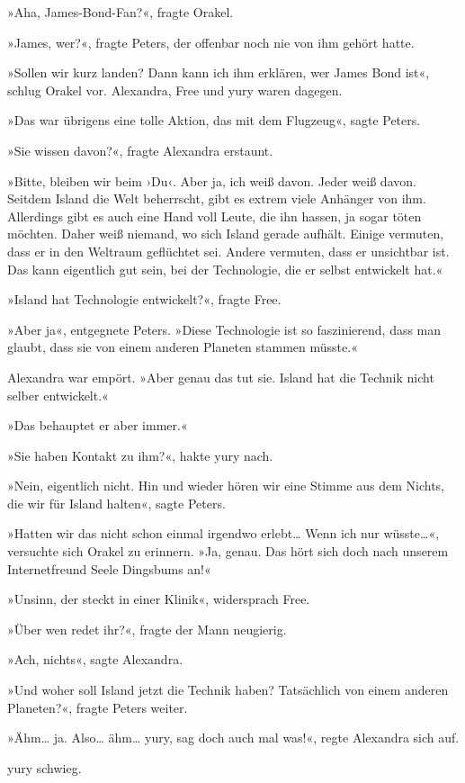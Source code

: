 »Aha, James-Bond-Fan?«, fragte Orakel.

»James, wer?«, fragte Peters, der offenbar noch nie von ihm gehört hatte.

»Sollen wir kurz landen? Dann kann ich ihm erklären, wer James Bond ist«, schlug Orakel vor. Alexandra, Free und yury waren dagegen.

»Das war übrigens eine tolle Aktion, das mit dem Flugzeug«, sagte Peters.

»Sie wissen davon?«, fragte Alexandra erstaunt.

»Bitte, bleiben wir beim ›Du‹. Aber ja, ich weiß davon. Jeder weiß davon. Seitdem Island die Welt beherrscht, gibt es extrem viele Anhänger von ihm. Allerdings gibt es auch eine Hand voll Leute, die ihn hassen, ja sogar töten möchten. Daher weiß niemand, wo sich Island gerade aufhält. Einige vermuten, dass er in den Weltraum geflüchtet sei. Andere vermuten, dass er unsichtbar ist. Das kann eigentlich gut sein, bei der Technologie, die er selbst entwickelt hat.«

»Island hat Technologie entwickelt?«, fragte Free.

»Aber ja«, entgegnete Peters. »Diese Technologie ist so faszinierend, dass man glaubt, dass sie von einem anderen Planeten stammen müsste.«

Alexandra war empört. »Aber genau das tut sie. Island hat die Technik nicht selber entwickelt.«

»Das behauptet er aber immer.«

»Sie haben Kontakt zu ihm?«, hakte yury nach.

»Nein, eigentlich nicht. Hin und wieder hören wir eine Stimme aus dem Nichts, die wir für Island halten«, sagte Peters.

»Hatten wir das nicht schon einmal irgendwo erlebt… Wenn ich nur wüsste…«, versuchte sich Orakel zu erinnern. »Ja, genau. Das hört sich doch nach unserem Internetfreund Seele Dingsbums an!«

»Unsinn, der steckt in einer Klinik«, widersprach Free.

»Über wen redet ihr?«, fragte der Mann neugierig.

»Ach, nichts«, sagte Alexandra.

»Und woher soll Island jetzt die Technik haben? Tatsächlich von einem anderen Planeten?«, fragte Peters weiter.

»Ähm… ja. Also… ähm… yury, sag doch auch mal was!«, regte Alexandra sich auf.

yury schwieg.

